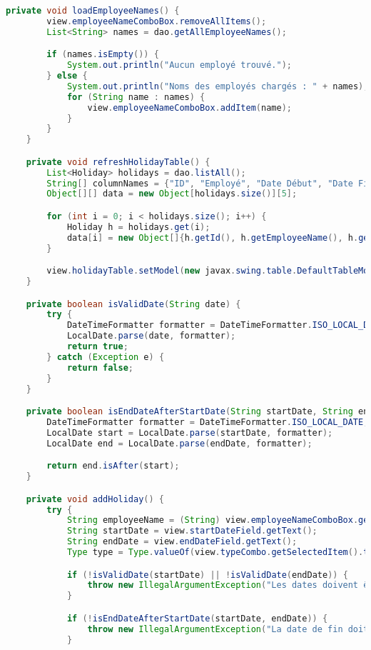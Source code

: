 \documentclass[a4paper,12pt]{article}
\begin{document}
\begin{lstlisting}[language=Java]
    private void loadEmployeeNames() {
        view.employeeNameComboBox.removeAllItems();
        List<String> names = dao.getAllEmployeeNames();

        if (names.isEmpty()) {
            System.out.println("Aucun employé trouvé.");
        } else {
            System.out.println("Noms des employés chargés : " + names);
            for (String name : names) {
                view.employeeNameComboBox.addItem(name);
            }
        }
    }

    private void refreshHolidayTable() {
        List<Holiday> holidays = dao.listAll();
        String[] columnNames = {"ID", "Employé", "Date Début", "Date Fin", "Type"};
        Object[][] data = new Object[holidays.size()][5];

        for (int i = 0; i < holidays.size(); i++) {
            Holiday h = holidays.get(i);
            data[i] = new Object[]{h.getId(), h.getEmployeeName(), h.getStartDate(), h.getEndDate(), h.getType()};
        }

        view.holidayTable.setModel(new javax.swing.table.DefaultTableModel(data, columnNames));
    }

    private boolean isValidDate(String date) {
        try {
            DateTimeFormatter formatter = DateTimeFormatter.ISO_LOCAL_DATE;
            LocalDate.parse(date, formatter);
            return true;
        } catch (Exception e) {
            return false;
        }
    }

    private boolean isEndDateAfterStartDate(String startDate, String endDate) {
        DateTimeFormatter formatter = DateTimeFormatter.ISO_LOCAL_DATE;
        LocalDate start = LocalDate.parse(startDate, formatter);
        LocalDate end = LocalDate.parse(endDate, formatter);

        return end.isAfter(start);
    }

    private void addHoliday() {
        try {
            String employeeName = (String) view.employeeNameComboBox.getSelectedItem();
            String startDate = view.startDateField.getText();
            String endDate = view.endDateField.getText();
            Type type = Type.valueOf(view.typeCombo.getSelectedItem().toString().toUpperCase());

            if (!isValidDate(startDate) || !isValidDate(endDate)) {
                throw new IllegalArgumentException("Les dates doivent être au format YYYY-MM-DD.");
            }

            if (!isEndDateAfterStartDate(startDate, endDate)) {
                throw new IllegalArgumentException("La date de fin doit être supérieure à la date de début.");
            }


\end{lstlisting}
\end{document}
